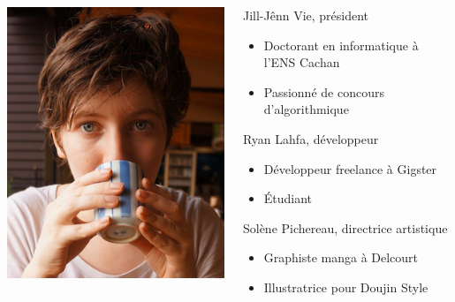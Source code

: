 \documentclass[handout]{beamer}
\begin{document}
\begin{frame}
\begin{columns}
\begin{column}{0.2\textwidth}
	\includegraphics[width=\linewidth]{figures/solene.jpg}
	\end{column}
	\begin{column}{0.8\textwidth}
	\begin{block}{Jill-Jênn Vie, président}
	\begin{itemize}
	\item Doctorant en informatique à l'ENS Cachan
	\item Passionné de concours d'algorithmique
	\end{itemize}
	\end{block}
	\pause
	\begin{block}{Ryan Lahfa, développeur}
	\begin{itemize}
	\item Développeur freelance à Gigster
	\item Étudiant
	\end{itemize}
	\end{block}
	\pause
	\begin{block}{Solène Pichereau, directrice artistique}
	\begin{itemize}
	\item Graphiste manga à Delcourt
	\item Illustratrice pour Doujin Style
	\end{itemize}
	\end{block}
	\end{column}
	\end{columns}
\end{frame}
\end{document}
